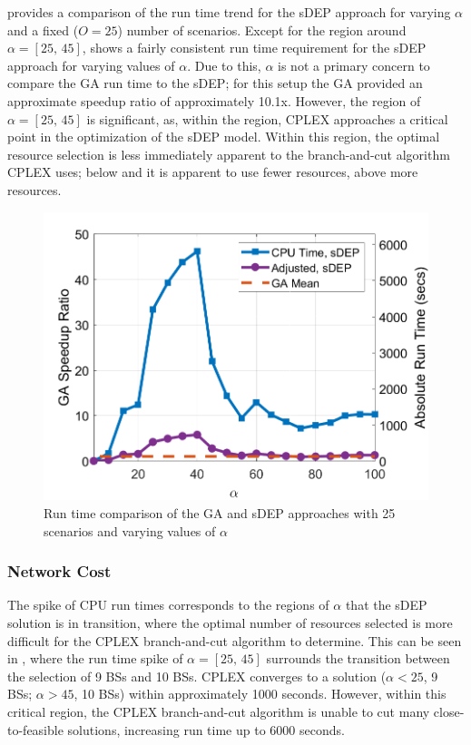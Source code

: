 \documentclass[12pt,dvipsnames]{report}
\begin{document}
 provides a comparison of the run time trend for the sDEP approach for varying $\alpha$ and a fixed ($O = 25$) number of scenarios.  Except for the region around $\alpha = \left[ 25,\, 45 \right]$, shows a fairly consistent run time requirement for the sDEP approach for varying values of $\alpha$.  Due to this, $\alpha$ is not a primary concern to compare the GA run time to the sDEP; for this setup the GA provided an approximate speedup ratio of approximately 10.1x.  However, the region of $\alpha = \left[ 25,\, 45 \right]$ is significant, as, within the region, CPLEX approaches a critical point in the optimization of the sDEP model.  Within this region, the optimal resource selection is less immediately apparent to the branch-and-cut algorithm CPLEX uses; below and it is apparent to use fewer resources, above more resources.

\begin{figure}[ht]
	\centering
	\includegraphics[height=0.45\textheight]{Figures/Prelim_O25_CPUTime_VOSGA25ScenarioSet}
	\caption[Preliminary simulation run time comparison of the GA and sDEP approaches with fixed scenarios]{Run time comparison of the GA and sDEP approaches with 25 scenarios and varying values of $\alpha$}
	\label{fig:Prelim_O25_CPUTime}
\end{figure}

\subsubsection{Network Cost}

The spike of CPU run times corresponds to the regions of $\alpha$ that the sDEP solution is in transition, where the optimal number of resources selected is more difficult for the CPLEX branch-and-cut algorithm to determine.  This can be seen in , where the run time spike of $\alpha = \left[ 25,\, 45 \right]$ surrounds the transition between the selection of 9 BSs and 10 BSs.  CPLEX converges to a solution ($\alpha < 25$, 9 BSs; $\alpha > 45$, 10 BSs) within approximately 1000 seconds.  However, within this critical region, the CPLEX branch-and-cut algorithm is unable to cut many close-to-feasible solutions, increasing run time up to 6000 seconds.
\end{document}
